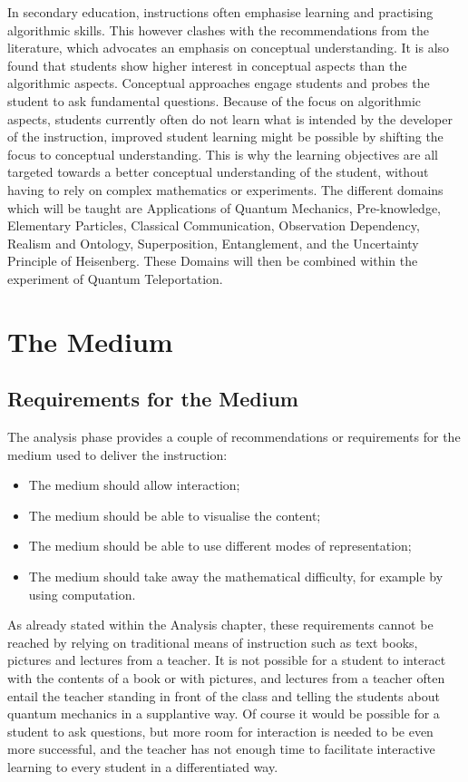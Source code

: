 \documentclass[11pt,twoside]{report} %
\begin{document}
In secondary education, instructions often emphasise learning and practising algorithmic skills. This however clashes with the recommendations from the literature, which advocates an emphasis on conceptual understanding. It is also found that students show higher interest in conceptual aspects than the algorithmic aspects. Conceptual approaches engage students and probes the student to ask fundamental questions. Because of the focus on algorithmic aspects, students currently often do not learn what is intended by the developer of the instruction, improved student learning might be possible by shifting the focus to conceptual understanding. This is why the learning objectives are all targeted towards a better conceptual understanding of the student, without having to rely on complex mathematics or experiments. The different domains which will be taught are Applications of Quantum Mechanics, Pre-knowledge, Elementary Particles, Classical Communication, Observation Dependency, Realism and Ontology, Superposition, Entanglement, and the Uncertainty Principle of Heisenberg. These Domains will then be combined within the experiment of Quantum Teleportation.

\chapter{The Medium}

\section{Requirements for the Medium}

The analysis phase provides a couple of recommendations or requirements for the medium used to deliver the instruction:

\begin{itemize}
\item The medium should allow interaction;
\item The medium should be able to visualise the content;
\item The medium should be able to use different modes of representation;
\item The medium should take away the mathematical difficulty, for example by using computation.
\end{itemize}

As already stated within the Analysis chapter, these requirements cannot be reached by relying on traditional means of instruction such as text books, pictures and lectures from a teacher. It is not possible for a student to interact with the contents of a book or with pictures, and lectures from a teacher often entail the teacher standing in front of the class and telling the students about quantum mechanics in a supplantive way. Of course it would be possible for a student to ask questions, but more room for interaction is needed to be even more successful, and the teacher has not enough time to facilitate interactive learning to every student in a differentiated way.
\end{document}
